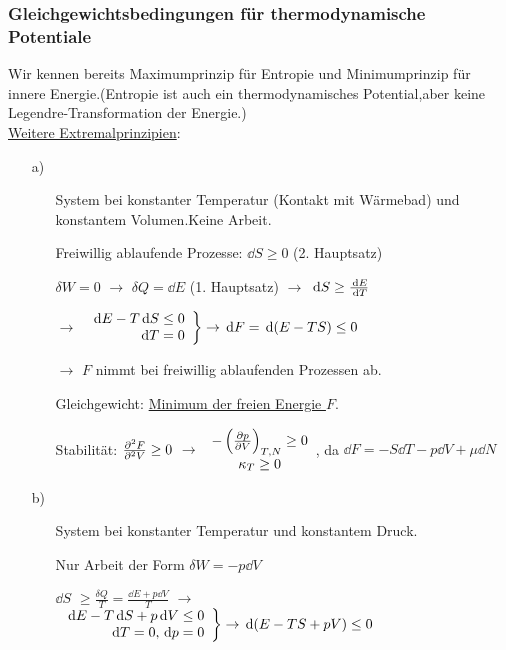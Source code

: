 \subsubsection{Gleichgewichtsbedingungen für thermodynamische Potentiale}
Wir kennen bereits Maximumprinzip für Entropie und Minimumprinzip für innere Energie.(Entropie ist auch ein thermodynamisches Potential,aber keine Legendre-Transformation der Energie.)\\
\uline{Weitere Extremalprinzipien}:
\begin{itemize}[align=left]
  \item[a)] \begin{itemize}[align=left]
    \item[System] bei konstanter Temperatur (Kontakt mit Wärmebad) und konstantem Volumen.Keine Arbeit.
    \item[Freiwillig ablaufende Prozesse:] $\dd{S} \geq 0$ (2. Hauptsatz)
    \item[$\delta W = 0$] $\rightarrow$ $\delta Q = \dd{E}$ (1. Hauptsatz) $\rightarrow$ $\dd{S} \geq \ddv{E}{T}$
    \item[$\rightarrow$] $\left.\begin{array}{r} \dd{E}- T \dd{S} \leq 0\\ \dd{T} = 0\end{array}\right\} \rightarrow \dd{F} = \dd{\norBra{E-TS}} \leq 0$
    \item[$\rightarrow$] $F$ nimmt bei freiwillig ablaufenden Prozessen ab.
    \item[Gleichgewicht:] \uline{Minimum der freien Energie $F$}.
    \item[Stabilität:] $\nppv{F}{V}{2} \geq 0$ $\rightarrow$ $\begin{array}{c}-\pdv{p}{V}{T,N} \geq 0 \\ \kappa_T \geq 0\end{array}$, da $\dd{F} = - S \dd{T} - p \dd{V} + \mu \dd{N}$
  \end{itemize}
  \item[b)] \begin{itemize}[align=left]
    \item[System] bei konstanter Temperatur und konstantem Druck.
    \item[Nur] Arbeit der Form $\delta W = - p \dd{V}$
    \item[$\dd{S}$] $\geq \frac{\delta Q}{T} = \frac{\dd{E}+p\dd{V}}{T}$ $\rightarrow$ $\left.\begin{array}{r}\dd{E} - T \dd{S} + p\dd{V} \leq 0 \\ \dd{T} = 0, \dd{p} = 0\end{array}\right\} \rightarrow \dd{\norBra{E-TS+pV}} \leq 0$

\end{itemize}
\end{itemize}

